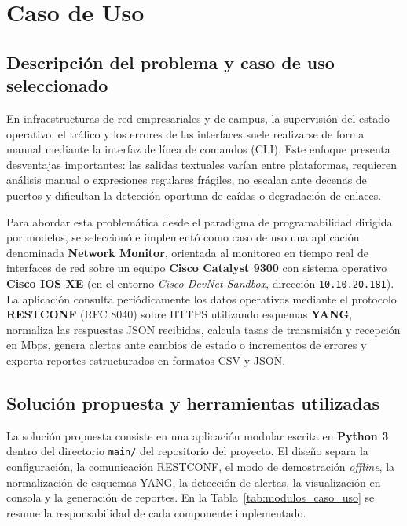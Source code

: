\documentclass[12pt,a4paper]{article}
\begin{document}
\newpage
\section{Caso de Uso}

\subsection{Descripción del problema y caso de uso seleccionado}

En infraestructuras de red empresariales y de campus, la supervisión del estado operativo, el tráfico y los errores de las interfaces suele realizarse de forma manual mediante la interfaz de línea de comandos (CLI). Este enfoque presenta desventajas importantes: las salidas textuales varían entre plataformas, requieren análisis manual o expresiones regulares frágiles, no escalan ante decenas de puertos y dificultan la detección oportuna de caídas o degradación de enlaces.

Para abordar esta problemática desde el paradigma de programabilidad dirigida por modelos, se seleccionó e implementó como caso de uso una aplicación denominada \textbf{Network Monitor}, orientada al monitoreo en tiempo real de interfaces de red sobre un equipo \textbf{Cisco Catalyst 9300} con sistema operativo \textbf{Cisco IOS XE} (en el entorno \textit{Cisco DevNet Sandbox}, dirección \texttt{10.10.20.181}). La aplicación consulta periódicamente los datos operativos mediante el protocolo \textbf{RESTCONF} (RFC 8040) sobre HTTPS utilizando esquemas \textbf{YANG}, normaliza las respuestas JSON recibidas, calcula tasas de transmisión y recepción en Mbps, genera alertas ante cambios de estado o incrementos de errores y exporta reportes estructurados en formatos CSV y JSON.

\subsection{Solución propuesta y herramientas utilizadas}

La solución propuesta consiste en una aplicación modular escrita en \textbf{Python 3} dentro del directorio \texttt{main/} del repositorio del proyecto. El diseño separa la configuración, la comunicación RESTCONF, el modo de demostración \textit{offline}, la normalización de esquemas YANG, la detección de alertas, la visualización en consola y la generación de reportes. En la Tabla~\ref{tab:modulos_caso_uso} se resume la responsabilidad de cada componente implementado.
\end{document}

